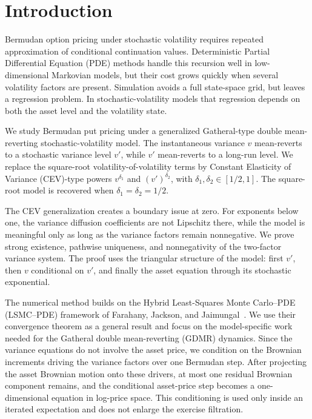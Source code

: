 \documentclass[pdflatex,sn-mathphys-num]{sn-jnl}
\theoremstyle{thmstyleone}%
\theoremstyle{thmstylethree}%
\theoremstyle{thmstyletwo}%
\begin{document}
\section{Introduction}

Bermudan option pricing under stochastic volatility requires repeated
approximation of conditional continuation values. Deterministic Partial
Differential Equation (PDE) methods handle this recursion well in
low-dimensional Markovian models, but their cost grows quickly when several
volatility factors are present. Simulation avoids a full state-space grid, but
leaves a regression problem. In stochastic-volatility models that
regression depends on both the asset level and the volatility state.

We study Bermudan put pricing under a generalized Gatheral-type double
mean-reverting stochastic-volatility model. The instantaneous variance $v$
mean-reverts to a stochastic variance level $v'$, while $v'$ mean-reverts to a
long-run level. We replace the square-root volatility-of-volatility terms by
Constant Elasticity of Variance (CEV)-type powers $v^{\delta_1}$ and
$(v')^{\delta_2}$, with
$\delta_1,\delta_2\in[1/2,1]$. The square-root model is recovered when
$\delta_1=\delta_2=1/2$.

The CEV generalization creates a boundary issue at zero. For exponents below
one, the variance diffusion coefficients are not Lipschitz there, while the
model is meaningful only as long as the variance factors remain nonnegative. We
prove strong existence, pathwise uniqueness, and nonnegativity of the
two-factor variance system. The proof uses
the triangular structure of the model: first $v'$, then $v$ conditional on
$v'$, and finally the asset equation through its stochastic exponential.

The numerical method builds on the Hybrid Least-Squares Monte Carlo--PDE
(LSMC--PDE) framework of Farahany, Jackson, and
Jaimungal~\cite{farahany2020mixing}. We use their convergence
theorem as a general result and focus on the model-specific work needed for the
Gatheral double mean-reverting (GDMR) dynamics. Since the variance
equations do not involve the asset price, we condition on the Brownian
increments driving the variance factors over one Bermudan step. After
projecting the asset Brownian motion onto these drivers, at most one residual
Brownian component remains, and the conditional asset-price step becomes a
one-dimensional equation in log-price space. This
conditioning is used only inside an iterated expectation and does not enlarge
the exercise filtration.
\end{document}
